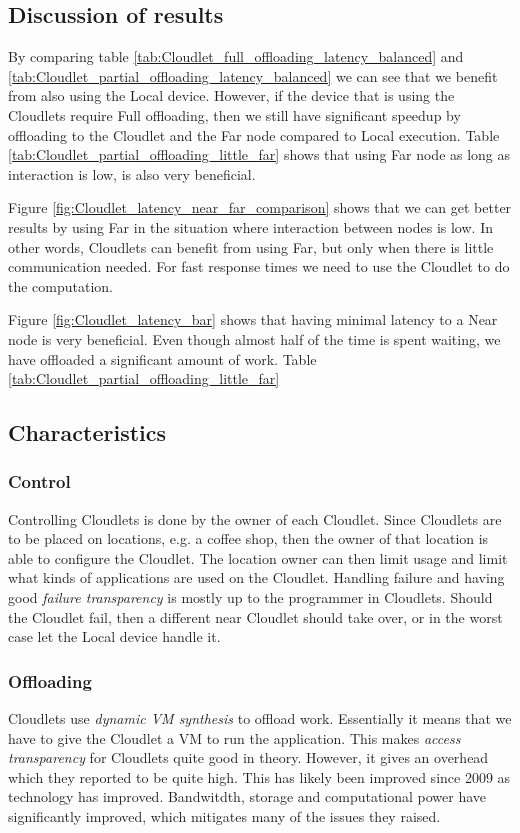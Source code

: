 \subsection{Discussion of results}
By comparing table \ref{tab:Cloudlet_full_offloading_latency_balanced} and \ref{tab:Cloudlet_partial_offloading_latency_balanced} we can see that we benefit from also using the Local device. However, if the device that is using the Cloudlets require Full offloading, then we still have significant speedup by offloading to the Cloudlet and the Far node compared to Local execution. Table \ref{tab:Cloudlet_partial_offloading_little_far} shows that using Far node as long as interaction is low, is also very beneficial.

Figure \ref{fig:Cloudlet_latency_near_far_comparison} shows that we can get better results by using Far in the situation where interaction between nodes is low. In other words, Cloudlets can benefit from using Far, but only when there is little communication needed. For fast response times we need to use the Cloudlet to do the computation. 

Figure \ref{fig:Cloudlet_latency_bar} shows that having minimal latency to a Near node is very beneficial. Even though almost half of the time is spent waiting, we have offloaded a significant amount of work. Table \ref{tab:Cloudlet_partial_offloading_little_far} 



\subsection{Characteristics}
\subsubsection{Control}
Controlling Cloudlets is done by the owner of each Cloudlet. Since Cloudlets are to be placed on locations, e.g. a coffee shop, then the owner of that location is able to configure the Cloudlet. The location owner can then limit usage and limit what kinds of applications are used on the Cloudlet. Handling failure and having good \textit{failure transparency} is mostly up to the programmer in Cloudlets. Should the Cloudlet fail, then a different near Cloudlet should take over, or in the worst case let the Local device handle it. 
\subsubsection{Offloading}
Cloudlets use \textit{dynamic VM synthesis} \cite{satyanarayanan_case_2009} to offload work. Essentially it means that we have to give the Cloudlet a VM to run the application. This makes \textit{access transparency} for Cloudlets quite good in theory. However, it gives an overhead which they reported to be quite high. This has likely been improved since 2009 as technology has improved. Bandwitdth, storage and computational power have significantly improved, which mitigates many of the issues they raised.
